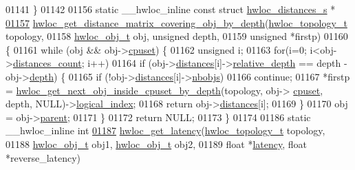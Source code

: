 \begin{DoxyCode}
01141 \}
01142 
01156 \textcolor{keyword}{static} \_\_hwloc\_inline \textcolor{keyword}{const} \textcolor{keyword}{struct }\hyperlink{a00014}{hwloc_distances_s} *
\hypertarget{a00031_source_l01157}{}\hyperlink{a00063_ga186ac2711b98a12cf46d58cd005fbb51}{01157} \hyperlink{a00063_ga186ac2711b98a12cf46d58cd005fbb51}{hwloc_get_distance_matrix_covering_obj_by_depth}(\hyperlink{a00039_ga9d1e76ee15a7dee158b786c30b6a6e38}{hwloc_topology_t} topology,
01158                                                 \hyperlink{a00016}{hwloc_obj_t} obj, \textcolor{keywordtype}{unsigned} depth,
01159                                                 \textcolor{keywordtype}{unsigned} *firstp)
01160 \{
01161   \textcolor{keywordflow}{while} (obj && obj->\hyperlink{a00016_a67925e0f2c47f50408fbdb9bddd0790f}{cpuset}) \{
01162     \textcolor{keywordtype}{unsigned} i;
01163     \textcolor{keywordflow}{for}(i=0; i<obj->\hyperlink{a00016_a8be6f63eca4da91000c832280db927b7}{distances_count}; i++)
01164       \textcolor{keywordflow}{if} (obj->\hyperlink{a00016_a9a5dd75596edc48fe834f81988cdc0d6}{distances}[i]->\hyperlink{a00014_a6fe066eaf62ee448aa05bab8e7217ff7}{relative_depth} == depth - obj->\hyperlink{a00016_a9d82690370275d42d652eccdea5d3ee5}{depth}) \{
01165         \textcolor{keywordflow}{if} (!obj->\hyperlink{a00016_a9a5dd75596edc48fe834f81988cdc0d6}{distances}[i]->\hyperlink{a00014_a4ca2af858cebbce7324ec49903d09474}{nbobjs})
01166           \textcolor{keywordflow}{continue};
01167         *firstp = \hyperlink{a00054_ga8af256c2572f16520f95440b884c1bd6}{hwloc_get_next_obj_inside_cpuset_by_depth}(topology, obj->
      \hyperlink{a00016_a67925e0f2c47f50408fbdb9bddd0790f}{cpuset}, depth, NULL)->\hyperlink{a00016_a0d07fb7b8935e137c94d75a3eb492ae9}{logical_index};
01168         \textcolor{keywordflow}{return} obj->\hyperlink{a00016_a9a5dd75596edc48fe834f81988cdc0d6}{distances}[i];
01169       \}
01170     obj = obj->\hyperlink{a00016_adc494f6aed939992be1c55cca5822900}{parent};
01171   \}
01172   \textcolor{keywordflow}{return} NULL;
01173 \}
01174 
01186 \textcolor{keyword}{static} \_\_hwloc\_inline \textcolor{keywordtype}{int}
\hypertarget{a00031_source_l01187}{}\hyperlink{a00063_ga9addde99e34b815df47625f1d6191839}{01187} \hyperlink{a00063_ga9addde99e34b815df47625f1d6191839}{hwloc_get_latency}(\hyperlink{a00039_ga9d1e76ee15a7dee158b786c30b6a6e38}{hwloc_topology_t} topology,
01188                    \hyperlink{a00016}{hwloc_obj_t} obj1, \hyperlink{a00016}{hwloc_obj_t} obj2,
01189                    \textcolor{keywordtype}{float} *\hyperlink{a00014_a0f70f48d1bfb18e5e2008825da2967c9}{latency}, \textcolor{keywordtype}{float} *reverse\_latency)

\end{DoxyCode}
